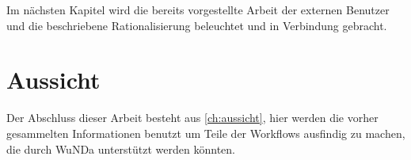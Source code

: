 Im nächsten Kapitel wird die bereits vorgestellte Arbeit der externen Benutzer und die beschriebene Rationalisierung beleuchtet und in Verbindung gebracht. 

\section{Aussicht}
Der Abschluss dieser Arbeit besteht aus \autoref{ch:aussicht}, hier werden die vorher gesammelten Informationen benutzt um Teile der Workflows ausfindig zu machen, die durch \ac{WuNDa} unterstützt werden könnten. 






